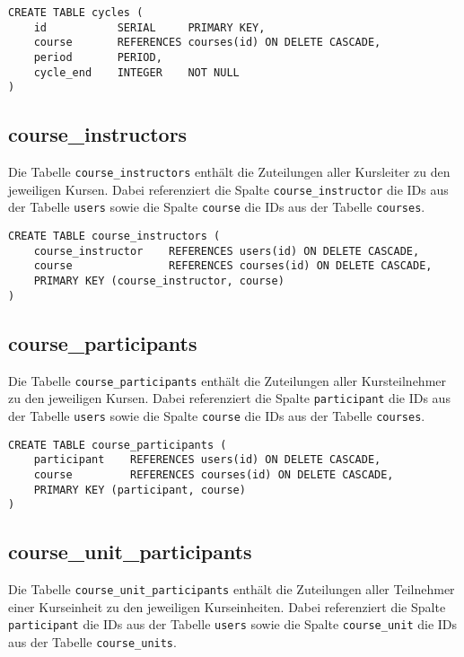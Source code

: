 \begin{verbatim}
CREATE TABLE cycles (
    id           SERIAL     PRIMARY KEY,
    course       REFERENCES courses(id) ON DELETE CASCADE,
    period       PERIOD,
    cycle_end    INTEGER    NOT NULL
)
\end{verbatim}

\subsection{course\_instructors}
Die Tabelle \texttt{course\_instructors} enthält die Zuteilungen aller Kursleiter zu den jeweiligen Kursen. Dabei referenziert die Spalte \texttt{course\_instructor} die IDs aus der Tabelle \texttt{users} sowie die Spalte \texttt{course} die IDs aus der Tabelle \texttt{courses}.

\begin{verbatim}
CREATE TABLE course_instructors (
    course_instructor    REFERENCES users(id) ON DELETE CASCADE,
    course               REFERENCES courses(id) ON DELETE CASCADE,
	PRIMARY KEY (course_instructor, course)
)
\end{verbatim}

\subsection{course\_participants}
Die Tabelle \texttt{course\_participants} enthält die Zuteilungen aller Kursteilnehmer zu den jeweiligen Kursen. Dabei referenziert die Spalte \texttt{participant} die IDs aus der Tabelle \texttt{users} sowie die Spalte \texttt{course} die IDs aus der Tabelle \texttt{courses}.

\begin{verbatim}
CREATE TABLE course_participants (
    participant    REFERENCES users(id) ON DELETE CASCADE,
    course         REFERENCES courses(id) ON DELETE CASCADE,
    PRIMARY KEY (participant, course)
)
\end{verbatim}

\subsection{course\_unit\_participants}
Die Tabelle \texttt{course\_unit\_participants} enthält die Zuteilungen aller Teilnehmer einer Kurseinheit zu den jeweiligen Kurseinheiten. Dabei referenziert die Spalte \texttt{participant} die IDs aus der Tabelle \texttt{users} sowie die Spalte \texttt{course\_unit} die IDs aus der Tabelle \texttt{course\_units}.

